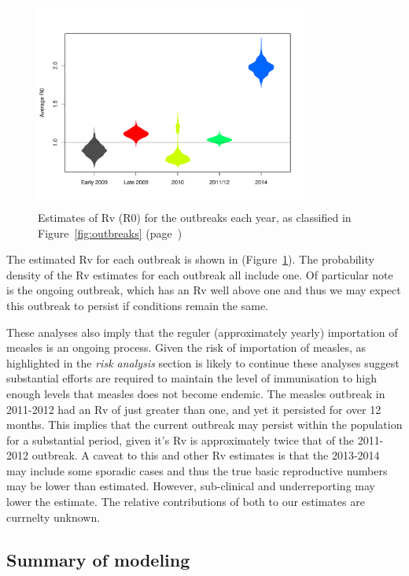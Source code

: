 \documentclass{article}
\begin{document}
\begin{figure}
     \centering
     \includegraphics[width=0.8\textwidth]{averageR0.pdf}
     \caption{Estimates of Rv (R0) for the outbreaks each year, as classified in Figure~\ref{fig:outbreaks} (page~\pageref{fig:outbreaks})}
     \label{fig:r0}
\end{figure}

The estimated Rv for each outbreak is shown in (Figure~\ref{fig:r0}). The probability density of the Rv estimates for each outbreak all include one. Of particular note is the ongoing outbreak, which has an Rv well above one and thus we may expect this outbreak to persist if conditions remain the same.

These analyses also imply that the reguler (approximately yearly) importation of measles is an ongoing process. Given the risk of importation of measles, as highlighted in the \emph {risk analysis} section is likely to continue these analyses suggest substantial efforts are required to maintain the level of immunisation to high enough levels that measles does not become endemic. The measles outbreak in 2011-2012 had an Rv of just greater than one, and yet it persisted for over 12 months. This implies that the current outbreak may persist within the population for a substantial period, given it's Rv is approximately twice that of the 2011-2012 outbreak. A caveat to this and other Rv estimates is that the 2013-2014 may include some sporadic cases and thus the true basic reproductive numbers may be lower than estimated. However, sub-clinical and underreporting may lower the estimate. The relative contributions of both to our estimates are currnelty unknown.

\subsection{Summary of modeling}
\end{document}
